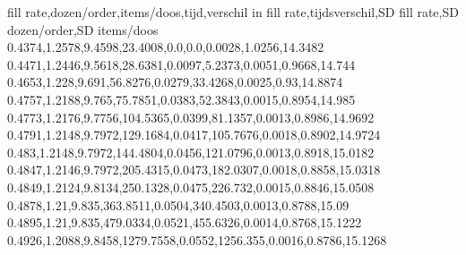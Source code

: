 fill rate,dozen/order,items/doos,tijd,verschil in fill rate,tijdsverschil,SD fill rate,SD dozen/order,SD items/doos
0.4374,1.2578,9.4598,23.4008,0.0,0.0,0.0028,1.0256,14.3482
0.4471,1.2446,9.5618,28.6381,0.0097,5.2373,0.0051,0.9668,14.744
0.4653,1.228,9.691,56.8276,0.0279,33.4268,0.0025,0.93,14.8874
0.4757,1.2188,9.765,75.7851,0.0383,52.3843,0.0015,0.8954,14.985
0.4773,1.2176,9.7756,104.5365,0.0399,81.1357,0.0013,0.8986,14.9692
0.4791,1.2148,9.7972,129.1684,0.0417,105.7676,0.0018,0.8902,14.9724
0.483,1.2148,9.7972,144.4804,0.0456,121.0796,0.0013,0.8918,15.0182
0.4847,1.2146,9.7972,205.4315,0.0473,182.0307,0.0018,0.8858,15.0318
0.4849,1.2124,9.8134,250.1328,0.0475,226.732,0.0015,0.8846,15.0508
0.4878,1.21,9.835,363.8511,0.0504,340.4503,0.0013,0.8788,15.09
0.4895,1.21,9.835,479.0334,0.0521,455.6326,0.0014,0.8768,15.1222
0.4926,1.2088,9.8458,1279.7558,0.0552,1256.355,0.0016,0.8786,15.1268
